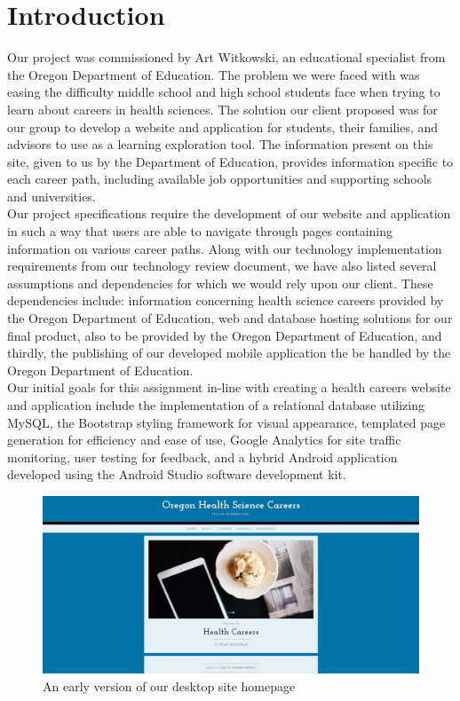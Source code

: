 \documentclass[onecolumn, draftclsnofoot,10pt, compsoc]{IEEEtran}
\begin{document}
\section{Introduction}

\noindent Our project was commissioned by Art Witkowski, an educational specialist from the Oregon Department of Education. The problem we were faced with was easing the difficulty middle school and high school students face when trying to learn about careers in health sciences. 
The solution our client proposed was for our group to develop a website and application for students, their families, and advisors to use as a learning exploration tool. 
The information present on this site, given to us by the Department of Education, provides information specific to each career path, including available job opportunities and supporting schools and universities. 
\\ 

\noindent Our project specifications require the development of our website and application in such a way that users are able to navigate through pages containing information on various career paths.
Along with our technology implementation requirements from our technology review document, we have also listed several assumptions and dependencies for which we would rely upon our client. These dependencies include: information concerning health science careers provided by the Oregon Department of Education,  web and database hosting solutions for our final product, also to be provided by the Oregon Department of Education, and thirdly, the publishing of our developed mobile application the be handled by the Oregon Department of Education.
\\ 

\noindent Our initial goals for this assignment in-line with creating a health careers website and application include the implementation of a relational database utilizing MySQL, the Bootstrap styling framework for visual appearance, templated page generation for efficiency and ease of use, Google Analytics for site traffic monitoring, user testing for feedback, and a hybrid Android application developed using the Android Studio software development kit.
\\

\begin{figure}[h]
\centerline{\includegraphics[scale=.3]{Figure_1.jpg} }
\caption{An early version of our desktop site homepage}
\end{figure}
\end{document}
